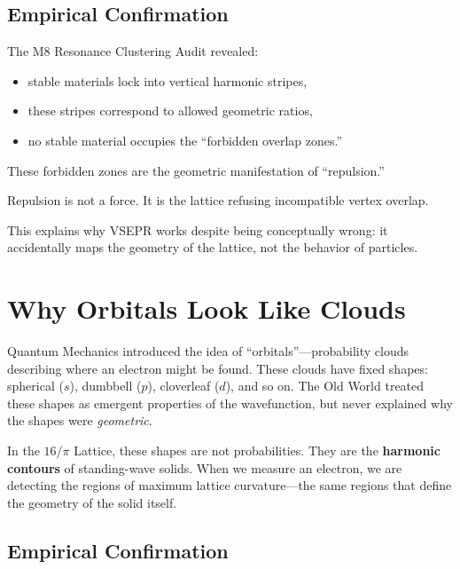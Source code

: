 \documentclass[11pt, letterpaper, openany]{book}
\begin{document}
\subsection*{Empirical Confirmation}

The M8 Resonance Clustering Audit revealed:

\begin{itemize}
    \item stable materials lock into vertical harmonic stripes,
    \item these stripes correspond to allowed geometric ratios,
    \item no stable material occupies the “forbidden overlap zones.”
\end{itemize}

These forbidden zones are the geometric manifestation of “repulsion.”

\begin{tcolorbox}[colback=black!5,colframe=black,title=Geometric Interpretation]
Repulsion is not a force.  
It is the lattice refusing incompatible vertex overlap.
\end{tcolorbox}

This explains why VSEPR works despite being conceptually wrong: it accidentally maps the
geometry of the lattice, not the behavior of particles.


\section{Why Orbitals Look Like Clouds}

Quantum Mechanics introduced the idea of “orbitals”—probability clouds describing where
an electron might be found. These clouds have fixed shapes: spherical ($s$), dumbbell ($p$),
cloverleaf ($d$), and so on. The Old World treated these shapes as emergent properties of
the wavefunction, but never explained why the shapes were \textit{geometric}.

In the $16/\pi$ Lattice, these shapes are not probabilities. They are the \textbf{harmonic
contours} of standing-wave solids. When we measure an electron, we are detecting the
regions of maximum lattice curvature—the same regions that define the geometry of the
solid itself.

\subsection*{Empirical Confirmation}
\end{document}
